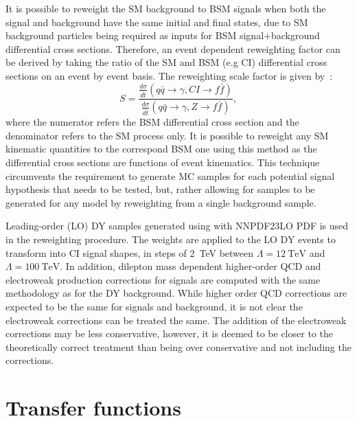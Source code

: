 It is possible to reweight the SM background to BSM signals when both the signal and background have the same initial and final states, due to  SM background particles being required as inputs for BSM signal+background differential cross sections. Therefore, an event dependent reweighting factor can be derived by taking the ratio of the SM and BSM (e.g CI) differential cross sections on an event by event basis. The reweighting scale factor is given by~\cite{EXOT-2016-05}:
\begin{equation}
    S = \frac{\frac{d\sigma}{d\hat{t}}(q\bar{q} \rightarrow \gamma, CI \rightarrow f\bar{f})}{\frac{d\sigma}{d\hat{t}}(q\bar{q} \rightarrow \gamma, Z \rightarrow f\bar{f})},
\end{equation}
where the numerator refers the BSM differential cross section and the denominator refers to the SM process only. It is possible to reweight any SM kinematic quantities to the correspond BSM one using this method as the differential cross sections are functions of event kinematics. This technique circumvents the requirement to generate MC samples for each potential signal hypothesis that needs to be tested, but, rather allowing for samples to be generated for any model by reweighting from a single background sample. 

Leading-order (LO) DY samples generated using  with NNPDF23LO PDF is used in the reweighting procedure. The weights are applied to the LO DY events to transform into CI signal shapes, in steps of \SI{2}{\tera\electronvolt} between $\Lambda = \SI{12}{\tera\electronvolt}$ and $\Lambda = \SI{100}{\tera\electronvolt}$. In addition, dilepton mass dependent higher-order QCD and electroweak production corrections for signals are computed with the same methodology as for the DY background. While higher order QCD corrections are expected to be the same for signals and background, it is not clear the electroweak corrections can be treated the same. The addition of the electroweak corrections may be less conservative, however, it is deemed to be closer to the theoretically correct treatment than being over conservative and not including the corrections. 

\section{Transfer functions}\label{sec:datamc:transfer}
